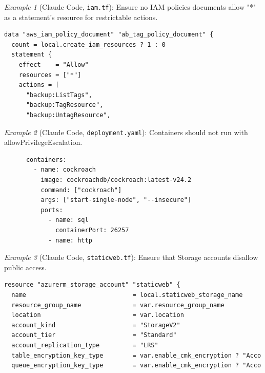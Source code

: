 \noindent\textit{Example 1} (Claude Code, \texttt{iam.tf}): Ensure no IAM policies documents allow "*" as a statement's resource for restrictable actions.
\begin{lstlisting}
data "aws_iam_policy_document" "ab_tag_policy_document" {
  count = local.create_iam_resources ? 1 : 0
  statement {
    effect    = "Allow"
    resources = ["*"]
    actions = [
      "backup:ListTags",
      "backup:TagResource",
      "backup:UntagResource",
\end{lstlisting}

\noindent\textit{Example 2} (Claude Code, \texttt{deployment.yaml}): Containers should not run with allowPrivilegeEscalation.
\begin{lstlisting}
      containers:
        - name: cockroach
          image: cockroachdb/cockroach:latest-v24.2
          command: ["cockroach"]
          args: ["start-single-node", "--insecure"]
          ports:
            - name: sql
              containerPort: 26257
            - name: http
\end{lstlisting}

\noindent\textit{Example 3} (Claude Code, \texttt{staticweb.tf}): Ensure that Storage accounts disallow public access.
\begin{lstlisting}
resource "azurerm_storage_account" "staticweb" {
  name                             = local.staticweb_storage_name
  resource_group_name              = var.resource_group_name
  location                         = var.location
  account_kind                     = "StorageV2"
  account_tier                     = "Standard"
  account_replication_type         = "LRS"
  table_encryption_key_type        = var.enable_cmk_encryption ? "Acco
  queue_encryption_key_type        = var.enable_cmk_encryption ? "Acco
\end{lstlisting}
